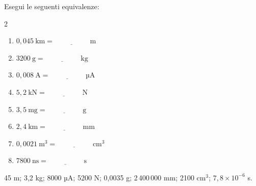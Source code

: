 \begin{question}[ID=2.1, subtitle={Equivalenze di unità di misura — base}, tags={conversioni, unità di misura}, difficulty=facile]
Esegui le seguenti equivalenze:
\begin{center}\begin{minipage}{0.92\linewidth}
\begin{multicols}{2}
\begin{enumerate}
\item $0{,}045\ \text{km} = \underline{\hspace{2cm}}\ \text{m}$
\item $3200\ \text{g} = \underline{\hspace{2cm}}\ \text{kg}$
\item $0{,}008\ \text{A} = \underline{\hspace{2cm}}\ \text{µA}$
\item $5{,}2\ \text{kN} = \underline{\hspace{2cm}}\ \text{N}$
\item $3{,}5\ \text{mg} = \underline{\hspace{2cm}}\ \text{g}$
\item $2{,}4\ \text{km} = \underline{\hspace{2cm}}\ \text{mm}$
\item $0{,}0021\ \text{m}^3 = \underline{\hspace{2cm}}\ \text{cm}^3$
\item $7800\ \text{ns} = \underline{\hspace{2cm}}\ \text{s}$
\end{enumerate}
\end{multicols}
\end{minipage}\end{center}
\begin{solution}
45 m; 3,2 kg; 8000 µA; 5200 N; 0,0035 g; 2\,400\,000 mm; 2100 cm$^3$; $7{,}8\times10^{-6}$ s.
\end{solution}
\end{question}

